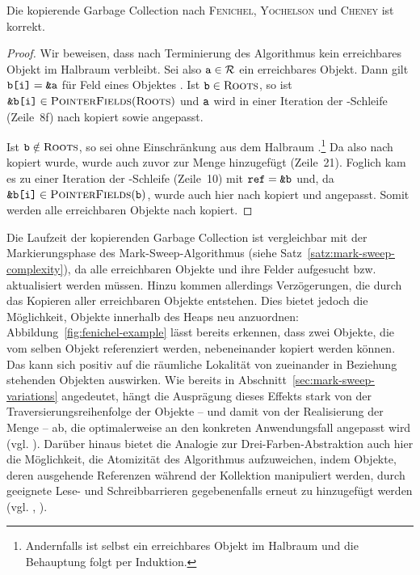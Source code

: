 \newpage

\begin{mybox}
\begin{satz}
	Die kopierende Garbage Collection nach \textsc{Fenichel}, \textsc{Yochelson} und \textsc{Cheney} ist korrekt.
\end{satz}
\end{mybox}

\begin{proof}
	Wir beweisen, dass nach Terminierung des Algorithmus kein erreichbares Objekt im Halbraum  verbleibt.
	Sei also $\texttt{a} \in \mathcal{R}$ ein erreichbares Objekt.
	Dann gilt $\texttt{b[i]} = \texttt{\&a}$ für Feld  eines Objektes .
	Ist $\texttt{b} \in \textsc{Roots}$, so ist $\texttt{\&b[i]} \in \textsc{PointerFields}(\textsc{Roots})$ und $\texttt{a}$ wird in einer Iteration der \FOREACH-Schleife (Zeile~8f) nach  kopiert sowie  angepasst.
	
	Ist $\texttt{b} \notin \textsc{Roots}$, so sei  ohne Einschränkung aus dem Halbraum .\footnote{Andernfalls ist  selbst ein erreichbares Objekt im Halbraum  und die Behauptung folgt per Induktion.}
	Da  also nach  kopiert wurde, wurde  auch zuvor zur Menge  hinzugefügt (Zeile~21).
	Foglich kam es zu einer Iteration der \WHILE-Schleife (Zeile~10) mit $\texttt{ref} = \texttt{\&b}$ und, da $\texttt{\&b[i]} \in \textsc{PointerFields}(\texttt{b})$, wurde auch hier  nach  kopiert und  angepasst.
	Somit werden alle erreichbaren Objekte nach  kopiert.	
\end{proof}

Die Laufzeit der kopierenden Garbage Collection ist vergleichbar mit der Markierungsphase des Mark-Sweep-Algorithmus (siehe Satz~\ref{satz:mark-sweep-complexity}), da alle erreichbaren Objekte und ihre Felder aufgesucht bzw. aktualisiert werden müssen.
Hinzu kommen allerdings Verzögerungen, die durch das Kopieren aller erreichbaren Objekte entstehen.
Dies bietet jedoch die Möglichkeit, Objekte innerhalb des Heaps neu anzuordnen:
Abbildung~\ref{fig:fenichel-example} lässt bereits erkennen, dass zwei Objekte, die vom selben Objekt referenziert werden, nebeneinander kopiert werden können.
Das kann sich positiv auf die räumliche Lokalität von zueinander in Beziehung stehenden Objekten auswirken.
Wie bereits in Abschnitt~\ref{sec:mark-sweep-variations} angedeutet, hängt die Ausprägung dieses Effekts stark von der Traversierungsreihenfolge der Objekte -- und damit von der Realisierung der Menge  -- ab, die optimalerweise an den konkreten Anwendungsfall angepasst wird (vgl. \cite[Kap. 4.2]{handbook}).
Darüber hinaus bietet die Analogie zur Drei-Farben-Abstraktion auch hier die Möglichkeit, die Atomizität des Algorithmus aufzuweichen, indem Objekte, deren ausgehende Referenzen während der Kollektion manipuliert werden, durch geeignete Lese- und Schreibbarrieren gegebenenfalls erneut zu  hinzugefügt werden (vgl. \cite[S. 129]{kero2007}, \cite[S. 41]{hosking2006}).

